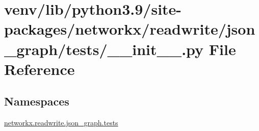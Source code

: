 \hypertarget{venv_2lib_2python3_89_2site-packages_2networkx_2readwrite_2json__graph_2tests_2____init_____8py}{}\section{venv/lib/python3.9/site-\/packages/networkx/readwrite/json\+\_\+graph/tests/\+\_\+\+\_\+init\+\_\+\+\_\+.py File Reference}
\label{venv_2lib_2python3_89_2site-packages_2networkx_2readwrite_2json__graph_2tests_2____init_____8py}
\subsection*{Namespaces}
\begin{DoxyCompactItemize}
\item 
 \hyperlink{namespacenetworkx_1_1readwrite_1_1json__graph_1_1tests}{networkx.\+readwrite.\+json\+\_\+graph.\+tests}
\end{DoxyCompactItemize}
